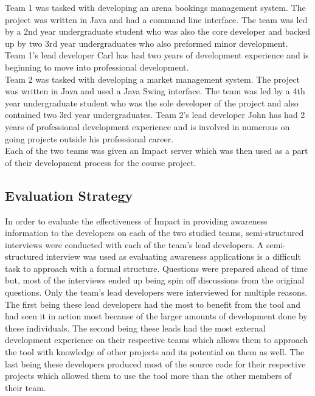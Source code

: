 \documentclass[conference]{IEEEtran}
\begin{document}
Team 1 was tasked with developing an arena bookings management system. The project was written in
Java and had a command line interface. The team was led by a 2nd year undergraduate student who was
also the core developer and backed up by two 3rd year undergraduates who also preformed minor
development. Team 1's lead developer Carl has had two years of development experience and is 
beginning to move into professional development.\\

Team 2 was tasked with developing a market management system. The project was written in Java
and used a Java Swing interface. The team was led by a 4th year undergraduate student who was
the sole developer of the project and also contained two 3rd year undergraduates. Team 2's lead
developer John has had 2 years of professional development experience and is involved in numerous
on going projects outside his professional career.\\

Each of the two teams was given an Impact server which was then used as a part of their development
process for the course project.

\subsection{Evaluation Strategy}
In order to evaluate the effectiveness of Impact in providing awareness information to the developers
on each of the two studied teams, semi-structured interviews were conducted with each of the team's
lead developers. A semi-structured interview was used as evaluating awareness applications is a
difficult task to approach with a formal structure. Questions were prepared ahead of time but, most
of the interviews ended up being spin off discussions from the original questions. Only the team's
lead developers were interviewed for multiple reasons. The first being these lead developers had the
most to benefit from the tool and had seen it in action most because of the larger amounts of
development done by these individuals. The second being these leads had the most external development
experience on their respective teams which allows them to approach the tool with knowledge of
other projects and its potential on them as well. The last being these developers produced most of
the source code for their respective projects which allowed them to use the tool more than the 
other members of their team.  \\
\end{document}
